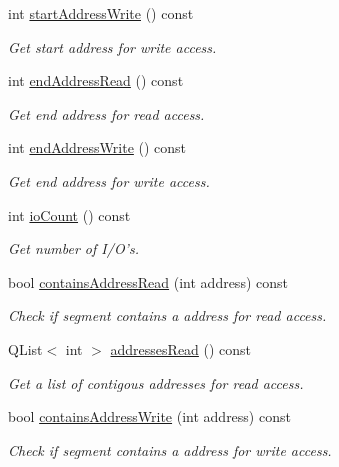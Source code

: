 \begin{DoxyCompactItemize}
int \hyperlink{classmdt_device_ios_segment_a5e0d32079a575623d1ae75f81a172169}{start\-Address\-Write} () const 
\begin{DoxyCompactList}\small\item\em Get start address for write access. \end{DoxyCompactList}\item 
int \hyperlink{classmdt_device_ios_segment_aa3a37811ccdefd9750e395f31f1bb472}{end\-Address\-Read} () const 
\begin{DoxyCompactList}\small\item\em Get end address for read access. \end{DoxyCompactList}\item 
int \hyperlink{classmdt_device_ios_segment_a92bb27b37027668c25e50958397961f6}{end\-Address\-Write} () const 
\begin{DoxyCompactList}\small\item\em Get end address for write access. \end{DoxyCompactList}\item 
int \hyperlink{classmdt_device_ios_segment_aa5d6905c7200a8fb74a6c86708be434e}{io\-Count} () const 
\begin{DoxyCompactList}\small\item\em Get number of I/\-O's. \end{DoxyCompactList}\item 
bool \hyperlink{classmdt_device_ios_segment_a895870593b581138ed7e43e6773741ed}{contains\-Address\-Read} (int address) const 
\begin{DoxyCompactList}\small\item\em Check if segment contains a address for read access. \end{DoxyCompactList}\item 
Q\-List$<$ int $>$ \hyperlink{classmdt_device_ios_segment_a6fceed16afdb918856792ede4e839d24}{addresses\-Read} () const 
\begin{DoxyCompactList}\small\item\em Get a list of contigous addresses for read access. \end{DoxyCompactList}\item 
bool \hyperlink{classmdt_device_ios_segment_a67b3a56f03a7dd8b6713a17908f88230}{contains\-Address\-Write} (int address) const 
\begin{DoxyCompactList}\small\item\em Check if segment contains a address for write access. \end{DoxyCompactList}\item 

\end{DoxyCompactItemize}
